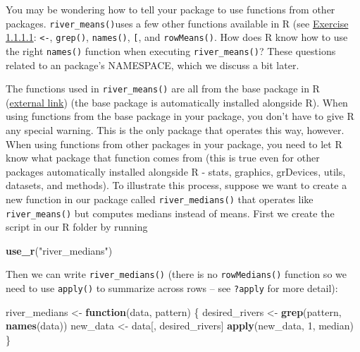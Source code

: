 \documentclass[
]{book}
\newenvironment{Shaded}{\begin{snugshade}}{\end{snugshade}}
\newcommand{\ControlFlowTok}[1]{\textcolor[rgb]{0.13,0.29,0.53}{\textbf{#1}}}
\newcommand{\DecValTok}[1]{\textcolor[rgb]{0.00,0.00,0.81}{#1}}
\newcommand{\KeywordTok}[1]{\textcolor[rgb]{0.13,0.29,0.53}{\textbf{#1}}}
\newcommand{\NormalTok}[1]{#1}
\newcommand{\StringTok}[1]{\textcolor[rgb]{0.31,0.60,0.02}{#1}}
\begin{document}
You may be wondering how to tell your package to use functions from other packages. \texttt{river\_means()}uses a few other functions available in R (see \protect\hyperlink{ex-set1}{Exercise 1.1.1.1}: \texttt{\textless{}-}, \texttt{grep()}, \texttt{names()}, \texttt{{[}}, and \texttt{rowMeans()}. How does R know how to use the right \texttt{names()} function when executing \texttt{river\_means()}? These questions related to an package's NAMESPACE, which we discuss a bit later.

The functions used in \texttt{river\_means()} are all from the base package in R (\href{https://stat.ethz.ch/R-manual/R-devel/library/base/html/00Index.html}{external link}) (the base package is automatically installed alongside R). When using functions from the base package in your package, you don't have to give R any special warning. This is the only package that operates this way, however. When using functions from other packages in your package, you need to let R know what package that function comes from (this is true even for other packages automatically installed alongside R - stats, graphics, grDevices, utils, datasets, and methods). To illustrate this process, suppose we want to create a new function in our package called \texttt{river\_medians()} that operates like \texttt{river\_means()} but computes medians instead of means. First we create the script in our R folder by running

\begin{Shaded}
\begin{Highlighting}[]
\KeywordTok{use_r}\NormalTok{(}\StringTok{"river_medians"}\NormalTok{)}
\end{Highlighting}
\end{Shaded}

Then we can write \texttt{river\_medians()} (there is no \texttt{rowMedians()} function so we need to use \texttt{apply()} to summarize across rows -- see \texttt{?apply} for more detail):

\begin{Shaded}
\begin{Highlighting}[]
\NormalTok{river_medians <-}\StringTok{ }\ControlFlowTok{function}\NormalTok{(data, pattern) \{}
\NormalTok{  desired_rivers <-}\StringTok{ }\KeywordTok{grep}\NormalTok{(pattern, }\KeywordTok{names}\NormalTok{(data))}
\NormalTok{  new_data <-}\StringTok{ }\NormalTok{data[, desired_rivers]}
  \KeywordTok{apply}\NormalTok{(new_data, }\DecValTok{1}\NormalTok{, median)}
\NormalTok{\}}
\end{Highlighting}
\end{Shaded}
\end{document}
